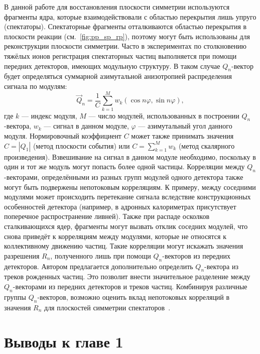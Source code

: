 В данной работе для восстановления плоскости симметрии используются фрагменты ядра, которые взаимодействовали с областью перекрытия лишь упруго (спектаторы). 
Спектаторные фрагменты отталкиваются областью перекрытия в плоскости реакции (см.~\ref{fig:pp_sp_rp}), поэтому могут быть использованы для реконструкции плоскости симметрии. 
Часто в экспериментах по столкновению тяжёлых ионов регистрация спектаторных частиц выполняется при помощи передних детекторов, имеющих модульную структуру. 
В таком случае $Q_n$-вектор будет определяться суммарной азимутальной анизотропией распределения сигнала по модулям:
%
\begin{equation}
    \vec{Q}_n  = \frac{1}{C} \sum_{k=1}^M w_k ( \cos n \varphi, \sin n \varphi ),
\end{equation}
%
где $k$ --- индекс модуля, $M$ --- число модулей, использованных в построении $Q_n$-вектора, $w_k$ --- сигнал в данном модуле, $\varphi$ --- азимутальный угол данного модуля. 
Нормировочный коэффициент $C$ может также принимать значения $C=|Q_1|$ (метод плоскости события) или $C=\sum_{k=1}^M w_k$ (метод скалярного произведения).
Взвешивание на сигнал в данном модуле необходимо, поскольку в один и тот же модуль могут попасть более одной частицы.
Корреляции между $Q_n$-векторами, определёнными из разных групп модулей одного детектора также могут быть подвержены непотоковым корреляциям.
К примеру, между соседними модулями может происходить перетекание сигнала вследствие конструкционных особенностей детектора (например, в адронных калориметрах присутствует поперечное распространение ливней).
Также при распаде осколков сталкивающихся ядер, фрагменты могут вызвать отклик соседних модулей, что снова приведёт к корреляциям между модулями, которые не относятся к коллективному движению частиц.
Такие корреляции могут искажать значения разрешения $R_n$, полученного лишь при помощи $Q_n$-векторов из передних детекторов.
Автором предлагается дополнительно определить $Q_n$-вектора из треков рожденных частиц.
Это позволит внести значительное разделение между $Q_n$-векторами из передних детекторов и треков частиц.
Комбинируя различные группы $Q_n$-векторов, возможно оценить вклад непотоковых корреляций в значения $R_n$ для плоскостей симметрии спектаторов~\cite{Mamaev:2023fpr,Mamaev:2023yhz,Mamaev:2024}.

\section{Выводы к главе 1}

